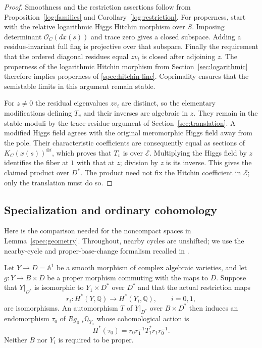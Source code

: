 \begin{proof}
Smoothness and the restriction assertions follow from
Proposition~\ref{log:families} and Corollary~\ref{log:restriction}.  For properness,
start with the relative logarithmic Higgs Hitchin morphism over $S$.
Imposing determinant $\mathcal O_C(dx(s))$ and trace zero gives a closed
subspace.  Adding a residue-invariant full flag is projective over that
subspace.  Finally the requirement that the ordered diagonal residues equal
$zv_i$ is closed after adjoining $z$.  The properness of the logarithmic
Hitchin morphism from Section~\ref{sec:logarithmic} therefore implies
properness of \eqref{spec:hitchin-line}.  Coprimality ensures that the
semistable limits in this argument remain stable.

For $z\ne0$ the residual eigenvalues $zv_i$ are distinct, so the elementary
modifications defining $T_v$ and their inverses are algebraic in $z$.
They remain in the stable moduli by the trace-residue argument of
Section~\ref{sec:translation}.  A modified Higgs field agrees with the
original meromorphic Higgs field away from the pole.  Their characteristic
coefficients are consequently equal as sections of
$K_C(x(s))^{\otimes i}$, which proves that $T_v$ is over $\mathcal E$.
Multiplying the Higgs field by $z$ identifies the fiber at $1$ with that at
$z$; division by $z$ is its inverse.  This gives the claimed product over
$D^*$.  The product need not fix the Hitchin coefficient in $\mathcal E$;
only the translation must do so.
\end{proof}

\subsection{Specialization and ordinary cohomology}

Here is the comparison needed for the noncompact spaces in
Lemma~\ref{spec:geometry}.  Throughout, nearby cycles are unshifted;
we use the nearby-cycle and proper-base-change formalism recalled in
\cite[Sections~5.5 and~5.8]{dCM2009}.

\begin{lemma}\label{spec:specialization}
Let $Y\to D=\mathbb A^1$ be a smooth morphism of complex algebraic varieties,
and let $g:Y\to B\times D$ be a proper morphism commuting with the maps to
$D$.  Suppose that $Y|_{D^*}$ is
isomorphic to $Y_1\times D^*$ over $D^*$ and that the actual restriction maps
\[
 r_i:H^*(Y,\mathbb Q)\longrightarrow H^*(Y_i,\mathbb Q),
 \qquad i=0,1,
\]
are isomorphisms.  An automorphism $T$ of $Y|_{D^*}$ over $B\times D^*$
then induces an endomorphism $\tau_0$ of $Rg_{0,*}\mathbb Q_{Y_0}$ whose
cohomological action is
\[
 H^*(\tau_0)=r_0r_1^{-1}T_1^*r_1r_0^{-1}.
\]
Neither $B$ nor $Y_i$ is required to be proper.
\end{lemma}

